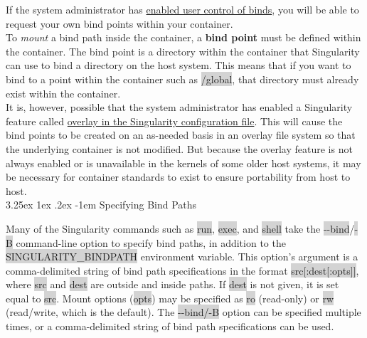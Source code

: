 \documentclass[a4paper]{article}
\makeatletter
\newcounter{subsubsubsection}[subsubsection]
\renewcommand\paragraph{\@startsection{paragraph}{5}{\z@}%
  {3.25ex \@plus1ex \@minus.2ex}%
  {-1em}%
  {\normalfont\normalsize\bfseries}}
\makeatother
\begin{document}
	
	If the system administrator has \href{http://singularity.lbl.gov/docs-config#user-bind-control-boolean-defaultyes}{enabled user control of binds}, you will be able to request your own bind points within your container.
	\\[0.1in]
	To \textit{mount} a bind path inside the container, a \textbf{bind point} must be defined within the container. The bind point is a directory within the container that Singularity can use to bind a directory on the host system. This means that if you want to bind to a point within the container such as \colorbox{lightgray}{/global}, that directory must already exist within the container.	\\[0.1in]
	It is, however, possible that the system administrator has enabled a Singularity feature called \href{http://singularity.lbl.gov/docs-config#enable-overlay-boolean-defaultno}{overlay in the Singularity configuration file}. This will cause the bind points to be created on an as-needed basis in an overlay file system so that the underlying container is not modified. But because the overlay feature is not always enabled or is unavailable in the kernels of some older host systems, it may be necessary for container standards to exist to ensure portability from host to host.\\[0.1in]

\paragraph{Specifying Bind Paths}
		
Many of the Singularity commands such as \colorbox{lightgray}{run}, \colorbox{lightgray}{exec}, and \colorbox{lightgray}{shell} take the \colorbox{lightgray}{-{}-bind}/\colorbox{lightgray}{-B} command-line option to specify bind paths, in addition to the \colorbox{lightgray}{SINGULARITY\_BINDPATH} environment variable. This option’s argument is a comma-delimited string of bind path specifications in the format \colorbox{lightgray}{src[:dest[:opts]]}, where \colorbox{lightgray}{src} and \colorbox{lightgray}{dest} are outside and inside paths. If \colorbox{lightgray}{dest} is not given, it is set equal to \colorbox{lightgray}{src}. Mount options (\colorbox{lightgray}{opts}) may be specified as \colorbox{lightgray}{ro} (read-only) or \colorbox{lightgray}{rw} (read/write, which is the default). The \colorbox{lightgray}{-{}-bind/-B} option can be specified multiple times, or a comma-delimited string of bind path specifications can be used.\\[0.1in]
\end{document}
